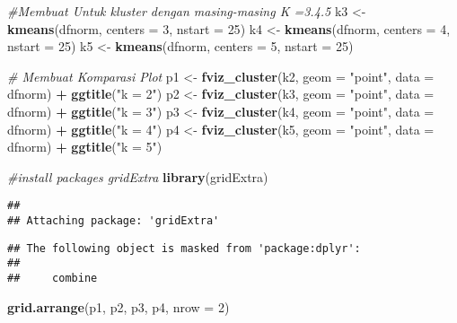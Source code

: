 \documentclass[]{article}
\newenvironment{Shaded}{\begin{snugshade}}{\end{snugshade}}
\newcommand{\CommentTok}[1]{\textcolor[rgb]{0.56,0.35,0.01}{\textit{#1}}}
\newcommand{\DataTypeTok}[1]{\textcolor[rgb]{0.13,0.29,0.53}{#1}}
\newcommand{\DecValTok}[1]{\textcolor[rgb]{0.00,0.00,0.81}{#1}}
\newcommand{\KeywordTok}[1]{\textcolor[rgb]{0.13,0.29,0.53}{\textbf{#1}}}
\newcommand{\NormalTok}[1]{#1}
\newcommand{\OperatorTok}[1]{\textcolor[rgb]{0.81,0.36,0.00}{\textbf{#1}}}
\newcommand{\StringTok}[1]{\textcolor[rgb]{0.31,0.60,0.02}{#1}}
\begin{document}
\begin{Shaded}
\begin{Highlighting}[]
\CommentTok{#Membuat Untuk kluster dengan masing-masing K =3.4.5}
\NormalTok{k3 <-}\StringTok{ }\KeywordTok{kmeans}\NormalTok{(dfnorm, }\DataTypeTok{centers =} \DecValTok{3}\NormalTok{, }\DataTypeTok{nstart =} \DecValTok{25}\NormalTok{)}
\NormalTok{k4 <-}\StringTok{ }\KeywordTok{kmeans}\NormalTok{(dfnorm, }\DataTypeTok{centers =} \DecValTok{4}\NormalTok{, }\DataTypeTok{nstart =} \DecValTok{25}\NormalTok{)}
\NormalTok{k5 <-}\StringTok{ }\KeywordTok{kmeans}\NormalTok{(dfnorm, }\DataTypeTok{centers =} \DecValTok{5}\NormalTok{, }\DataTypeTok{nstart =} \DecValTok{25}\NormalTok{)}

\CommentTok{# Membuat Komparasi Plot}
\NormalTok{p1 <-}\StringTok{ }\KeywordTok{fviz_cluster}\NormalTok{(k2, }\DataTypeTok{geom =} \StringTok{"point"}\NormalTok{, }\DataTypeTok{data =}\NormalTok{ dfnorm) }\OperatorTok{+}\StringTok{ }\KeywordTok{ggtitle}\NormalTok{(}\StringTok{"k = 2"}\NormalTok{)}
\NormalTok{p2 <-}\StringTok{ }\KeywordTok{fviz_cluster}\NormalTok{(k3, }\DataTypeTok{geom =} \StringTok{"point"}\NormalTok{, }\DataTypeTok{data =}\NormalTok{ dfnorm) }\OperatorTok{+}\StringTok{ }\KeywordTok{ggtitle}\NormalTok{(}\StringTok{"k = 3"}\NormalTok{)}
\NormalTok{p3 <-}\StringTok{ }\KeywordTok{fviz_cluster}\NormalTok{(k4, }\DataTypeTok{geom =} \StringTok{"point"}\NormalTok{, }\DataTypeTok{data =}\NormalTok{ dfnorm) }\OperatorTok{+}\StringTok{ }\KeywordTok{ggtitle}\NormalTok{(}\StringTok{"k = 4"}\NormalTok{)}
\NormalTok{p4 <-}\StringTok{ }\KeywordTok{fviz_cluster}\NormalTok{(k5, }\DataTypeTok{geom =} \StringTok{"point"}\NormalTok{, }\DataTypeTok{data =}\NormalTok{ dfnorm) }\OperatorTok{+}\StringTok{ }\KeywordTok{ggtitle}\NormalTok{(}\StringTok{"k = 5"}\NormalTok{)}

\CommentTok{#install packages gridExtra}
\KeywordTok{library}\NormalTok{(gridExtra) }
\end{Highlighting}
\end{Shaded}

\begin{verbatim}
## 
## Attaching package: 'gridExtra'
\end{verbatim}

\begin{verbatim}
## The following object is masked from 'package:dplyr':
## 
##     combine
\end{verbatim}

\begin{Shaded}
\begin{Highlighting}[]
\KeywordTok{grid.arrange}\NormalTok{(p1, p2, p3, p4, }\DataTypeTok{nrow =} \DecValTok{2}\NormalTok{)}
\end{Highlighting}
\end{Shaded}
\end{document}

